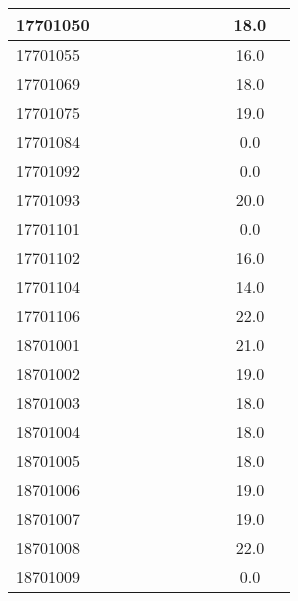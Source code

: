 \documentclass[12pt]{article}
\begin{document}
\begin{center}
\begin{small}
\begin{tabular}{|l|c|c|c|c|c|c|c|c|c|c|}
17701050 &  &  &  &  &  &  &  &  & 18.0\\ \hline 
17701055 &  &  &  &  &  &  &  &  & 16.0\\ \hline 
17701069 &  &  &  &  &  &  &  &  & 18.0\\ \hline 
17701075 &  &  &  &  &  &  &  &  & 19.0\\ \hline 
17701084 &  &  &  &  &  &  &  &  & 0.0\\ \hline 
17701092 &  &  &  &  &  &  &  &  & 0.0\\ \hline 
17701093 &  &  &  &  &  &  &  &  & 20.0\\ \hline 
17701101 &  &  &  &  &  &  &  &  & 0.0\\ \hline 
17701102 &  &  &  &  &  &  &  &  & 16.0\\ \hline 
17701104 &  &  &  &  &  &  &  &  & 14.0\\ \hline 
17701106 &  &  &  &  &  &  &  &  & 22.0\\ \hline 
18701001 &  &  &  &  &  &  &  &  & 21.0\\ \hline 
18701002 &  &  &  &  &  &  &  &  & 19.0\\ \hline 
18701003 &  &  &  &  &  &  &  &  & 18.0\\ \hline 
18701004 &  &  &  &  &  &  &  &  & 18.0\\ \hline 
18701005 &  &  &  &  &  &  &  &  & 18.0\\ \hline 
18701006 &  &  &  &  &  &  &  &  & 19.0\\ \hline 
18701007 &  &  &  &  &  &  &  &  & 19.0\\ \hline 
18701008 &  &  &  &  &  &  &  &  & 22.0\\ \hline 
18701009 &  &  &  &  &  &  &  &  & 0.0\\ \hline 
        \end{tabular}
            \end{small}
            \end{center}
  \centering
            
\end{document}
